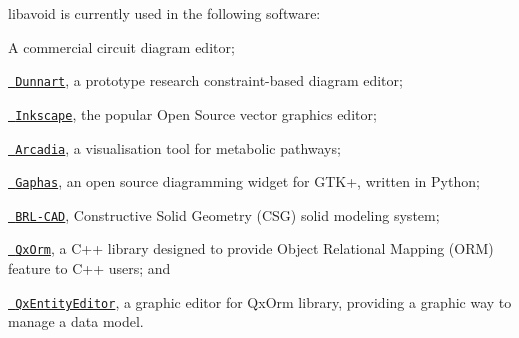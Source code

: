 libavoid is currently used in the following software\+:
\begin{DoxyItemize}
\item A commercial circuit diagram editor;
\item \href{http://users.monash.edu/~mwybrow/dunnart/}{\texttt{ Dunnart}}, a prototype research constraint-\/based diagram editor;
\item \href{http://www.inkscape.org/}{\texttt{ Inkscape}}, the popular Open Source vector graphics editor;
\item \href{http://arcadiapathways.sourceforge.net/}{\texttt{ Arcadia}}, a visualisation tool for metabolic pathways;
\item \href{http://gaphor.sourceforge.net/}{\texttt{ Gaphas}}, an open source diagramming widget for GTK+, written in Python;
\item \href{http://brlcad.org/}{\texttt{ BRL-\/\+CAD}}, Constructive Solid Geometry (CSG) solid modeling system;
\item \href{http://www.qxorm.com/}{\texttt{ Qx\+Orm}}, a C++ library designed to provide Object Relational Mapping (ORM) feature to C++ users; and
\item \href{http://www.qxorm.com/}{\texttt{ Qx\+Entity\+Editor}}, a graphic editor for Qx\+Orm library, providing a graphic way to manage a data model. 
\end{DoxyItemize}